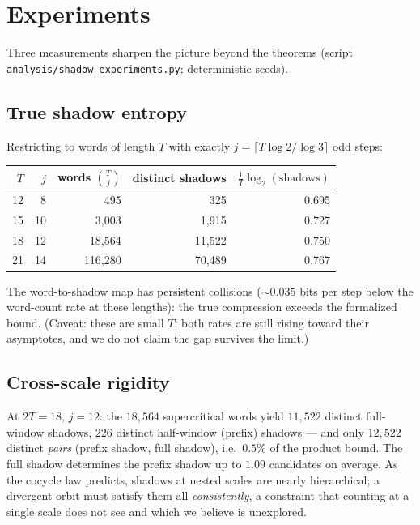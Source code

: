 \documentclass[11pt]{article}
\newcommand{\code}[1]{\texttt{#1}}
\begin{document}
\section{Experiments}\label{sec:experiments}

Three measurements sharpen the picture beyond the theorems
(script \code{analysis/shadow\_experiments.py}; deterministic seeds).

\subsection*{True shadow entropy}

Restricting to words of length $T$ with exactly
$j = \lceil T \log 2/\log 3\rceil$ odd steps:

\begin{center}
\begin{tabular}{rrrrr}
\toprule
$T$ & $j$ & words $\binom{T}{j}$ & distinct shadows &
$\tfrac{1}{T}\log_2(\text{shadows})$ \\
\midrule
12 & 8  & 495     & 325     & 0.695 \\
15 & 10 & 3{,}003   & 1{,}915   & 0.727 \\
18 & 12 & 18{,}564  & 11{,}522  & 0.750 \\
21 & 14 & 116{,}280 & 70{,}489  & 0.767 \\
\bottomrule
\end{tabular}
\end{center}

\noindent
The word-to-shadow map has persistent collisions ($\sim 0.035$ bits
per step below the word-count rate at these lengths): the true
compression exceeds the formalized bound. (Caveat: these are small
$T$; both rates are still rising toward their asymptotes, and we do
not claim the gap survives the limit.)

\subsection*{Cross-scale rigidity}

At $2T = 18$, $j = 12$: the $18{,}564$ supercritical words yield
$11{,}522$ distinct full-window shadows, $226$ distinct half-window
(prefix) shadows --- and only $12{,}522$ distinct \emph{pairs}
(prefix shadow, full shadow), i.e.\ $0.5\%$ of the product bound. The
full shadow determines the prefix shadow up to $1.09$ candidates on
average. As the cocycle law predicts, shadows at nested scales are
nearly hierarchical; a divergent orbit must satisfy them all
\emph{consistently}, a constraint that counting at a single scale does
not see and which we believe is unexplored.
\end{document}
